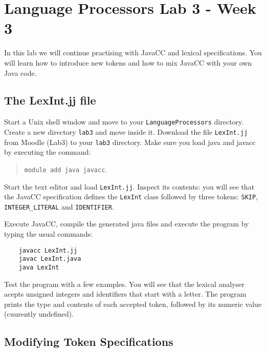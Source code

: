 \documentclass{article}
\begin{document}
\thispagestyle{empty}

\newcommand{\negra}[1]{\textbf{#1}}

\section*{Language Processors Lab 3 - Week 3 }

\medskip\noindent In this lab we will continue practising with JavaCC and lexical specifications. You will learn how to introduce new tokens and how to mix JavaCC with your own Java code.

\subsection*{The LexInt.jj file}

Start a Unix shell window and move to your {\tt LanguageProcessors} directory. Create a new directory {\tt lab3} and move inside it. Download the file {\tt LexInt.jj} from Moodle (Lab3) to your {\tt lab3} directory. Make sure you load java and javacc by executing the command:

\begin{quote}
{\tt module add java javacc}.
\end{quote}

Start the text editor and load {\tt LexInt.jj}. Inspect its contents: you will see that the JavaCC specification defines the {\tt LexInt} class followed by three tokens: \verb+SKIP+, \verb+INTEGER_LITERAL+ and \verb+IDENTIFIER+.

Execute JavaCC, compile the generated java files and execute the program by typing the usual commands:

\begin{verbatim}
    javacc LexInt.jj
    javac LexInt.java
    java LexInt
\end{verbatim}

Test the program with a few examples. You will see that the lexical analyser acepts unsigned integers and identifiers that start with a letter. The program prints the type and contents of each accepted token, followed by its numeric value (cuurently undefined).

\subsection*{Modifying Token Specifications}
\end{document}
